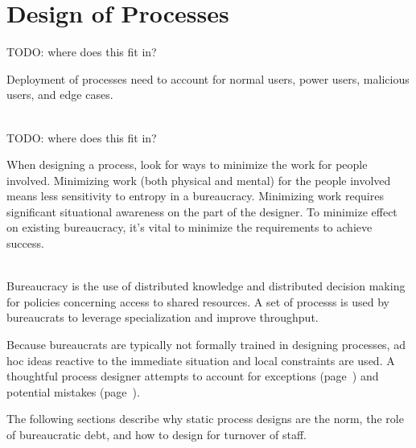 \section{Design of Processes\label{sec:design-of-processes}}

TODO: where does this fit in?

Deployment of processes need to account for 
normal users, power users, malicious users, and edge cases.

\ \\


TODO: where does this fit in?

When designing a process, look for ways to minimize the work for people involved. Minimizing work (both physical and mental) for the people involved means less sensitivity to entropy in a bureaucracy. Minimizing work requires significant situational awareness on the part of the designer. To minimize effect on existing bureaucracy, it's vital to minimize the requirements to achieve success.

\ \\


Bureaucracy is the use of distributed knowledge and distributed decision making for policies concerning access to shared resources. A set of \glspl{process} is used by \glspl{bureaucrat} to leverage specialization and improve throughput. 
    
Because bureaucrats are typically not formally trained in designing processes, ad hoc ideas reactive to the immediate situation and local constraints are used. A thoughtful process designer attempts to account for exceptions (page~\pageref{sec:exceptions-to-process}) and potential mistakes (page~\pageref{sec:process-mistakes}).

The following sections describe why static process designs are the norm, the role of bureaucratic debt, and how to design for turnover of staff.
    




 